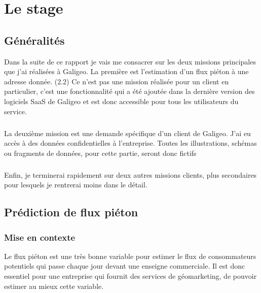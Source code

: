 \chapter[Le stage \ensg]{Le stage}

\section{Généralités}

Dans la suite de ce rapport je vais me consacrer sur les deux missions principales que j’ai réalisées à Galigeo. La première est l’estimation d’un flux piéton à une adresse donnée. (2.2) Ce n’est pas une mission réalisée pour un client en particulier, c’est une fonctionnalité qui a été ajoutée dans la dernière version des logiciels SaaS de Galigeo et est donc accessible pour tous les utilisateurs du service.

\paragraph*{}

La deuxième mission est une demande spécifique d’un client de Galigeo. J’ai eu accès à des données confidentielles à l’entreprise. Toutes les illustrations, schémas ou fragments de données, pour cette partie, seront donc fictifs

\paragraph*{}

Enfin, je terminerai rapidement sur deux autres missions clients, plus secondaires pour lesquels je rentrerai moins dans le détail.


\section{Prédiction de flux piéton}

\subsection{Mise en contexte}

Le flux piéton est une très bonne variable pour estimer le flux de consommateurs potentiels qui passe chaque jour devant une enseigne commerciale. Il est donc essentiel pour une entreprise qui fournit des services de géomarketing, de pouvoir estimer au mieux cette variable.

\paragraph*{}

